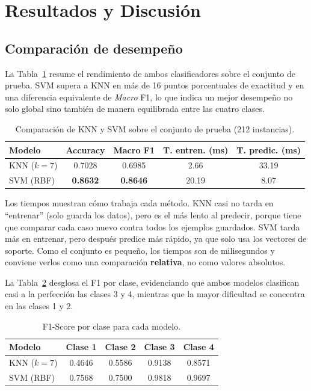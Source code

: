 \documentclass[11pt,letterpaper,twoside]{article}
\begin{document}
\section{Resultados y Discusión}
\label{sec:resultados}

\subsection{Comparación de desempeño}
La Tabla~\ref{tab:comparativa} resume el rendimiento de ambos clasificadores sobre el conjunto de prueba. SVM supera a KNN en más de 16 puntos porcentuales de exactitud y en una diferencia equivalente de \textit{Macro} F1, lo que indica un mejor desempeño no solo global sino también de manera equilibrada entre las cuatro clases.

\begin{table}[H]
\centering
\caption{Comparación de KNN y SVM sobre el conjunto de prueba (212 instancias).}
\label{tab:comparativa}
\begin{tabular}{lcccc}
\toprule
\textbf{Modelo} & \textbf{Accuracy} & \textbf{Macro F1} & \textbf{T. entren. (ms)} & \textbf{T. predic. (ms)} \\
\midrule
KNN ($k=7$)            & 0.7028 & 0.6985 & 2.66  & 33.19 \\
SVM (RBF)              & \textbf{0.8632} & \textbf{0.8646} & 20.19 & 8.07 \\
\bottomrule
\end{tabular}
\end{table}

Los tiempos muestran cómo trabaja cada método. KNN casi no tarda en ``entrenar'' (solo guarda los datos), pero es el más lento al predecir, porque tiene que comparar cada caso nuevo contra todos los ejemplos guardados. SVM tarda más en entrenar, pero después predice más rápido, ya que solo usa los vectores de soporte. Como el conjunto es pequeño, los tiempos son de milisegundos y conviene verlos como una comparación \textbf{relativa}, no como valores absolutos.

La Tabla~\ref{tab:porclase} desglosa el F1 por clase, evidenciando que ambos modelos clasifican casi a la perfección las clases 3 y 4, mientras que la mayor dificultad se concentra en las clases 1 y 2.

\begin{table}[H]
\centering
\caption{F1-Score por clase para cada modelo.}
\label{tab:porclase}
\begin{tabular}{lcccc}
\toprule
\textbf{Modelo} & \textbf{Clase 1} & \textbf{Clase 2} & \textbf{Clase 3} & \textbf{Clase 4} \\
\midrule
KNN ($k=7$) & 0.4646 & 0.5586 & 0.9138 & 0.8571 \\
SVM (RBF)   & 0.7568 & 0.7500 & 0.9818 & 0.9697 \\
\bottomrule
\end{tabular}
\end{table}
\end{document}
